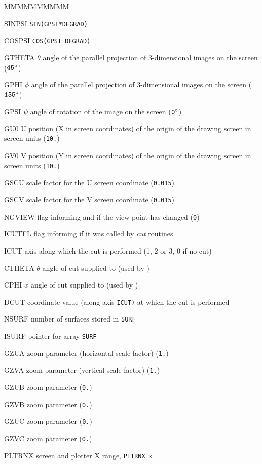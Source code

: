 \begin{DLtt}{MMMMMMMMMM}
\item[SINPSI] {\tt SIN(GPSI*DEGRAD)}
\item[COSPSI] {\tt COS(GPSI DEGRAD)}
\item[GTHETA] $\theta$ angle of the parallel projection of 3-dimensional
images on the screen (${\tt 45^{\circ}}$)
\item[GPHI]  $\phi$ angle of the parallel projection of 3-dimensional
images on the screen (${\tt 135^{\circ}}$)
\item[GPSI]  $\psi$ angle of rotation of the image on the screen
(${\tt 0^{\circ}}$)
\item[GU0]  U position (X in screen coordinates) of the origin of the drawing
screen in screen units ({\tt 10.})
\item[GV0]  V position (Y in screen coordinates) of the origin of the drawing
screen in screen units ({\tt 10.})
\item[GSCU]   scale factor for the U screen coordinate  ({\tt 0.015})
\item[GSCV]   scale factor for the V screen coordinate ({\tt 0.015})
\item[NGVIEW] flag informing  and  if
the view point has changed  ({\tt 0})
\item[ICUTFL] flag informing  if it was called by
{\it cut} routines
\item[ICUT] axis along which the cut is performed (1, 2 or 3, 0 if no cut)
\item[CTHETA] $\theta$ angle of cut supplied to  (used by
)
\item[CPHI] $\phi$ angle of cut supplied to  (used by
)
\item[DCUT] coordinate value (along axis {\tt ICUT)} at which the cut is
performed
\item[NSURF] number of surfaces stored in {\tt SURF}
\item[ISURF] pointer for array {\tt SURF}
\item[GZUA] zoom parameter (horizontal scale factor)  ({\tt 1.})
\item[GZVA] zoom parameter (vertical scale factor)  ({\tt 1.})
\item[GZUB] zoom parameter  ({\tt 0.})
\item[GZVB] zoom parameter  ({\tt 0.})
\item[GZUC] zoom parameter  ({\tt 0.})
\item[GZVC] zoom parameter  ({\tt 0.})
\item[PLTRNX] screen and plotter X range, {\tt PLTRNX} $\times$

\end{DLtt}

